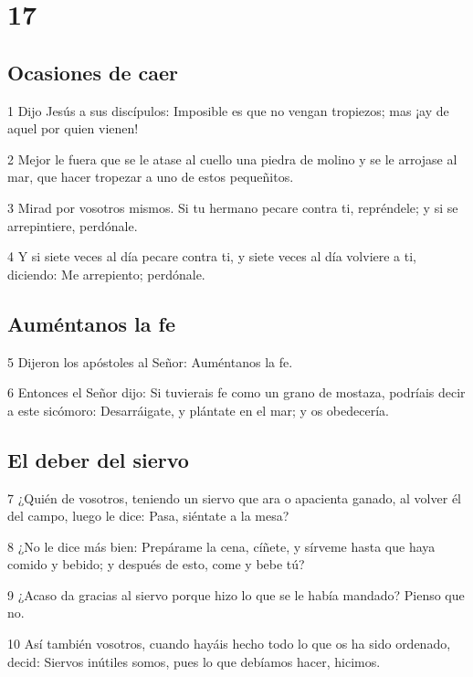 \chapter{17}

\section*{Ocasiones de caer}

\par 1 Dijo Jesús a sus discípulos: Imposible es que no vengan tropiezos; mas ¡ay de aquel por quien vienen!
\par 2 Mejor le fuera que se le atase al cuello una piedra de molino y se le arrojase al mar, que hacer tropezar a uno de estos pequeñitos.
\par 3 Mirad por vosotros mismos. Si tu hermano pecare contra ti, repréndele; y si se arrepintiere, perdónale.
\par 4 Y si siete veces al día pecare contra ti, y siete veces al día volviere a ti, diciendo: Me arrepiento; perdónale.

\section*{Auméntanos la fe}

\par 5 Dijeron los apóstoles al Señor: Auméntanos la fe.
\par 6 Entonces el Señor dijo: Si tuvierais fe como un grano de mostaza, podríais decir a este sicómoro: Desarráigate, y plántate en el mar; y os obedecería.

\section*{El deber del siervo}

\par 7 ¿Quién de vosotros, teniendo un siervo que ara o apacienta ganado, al volver él del campo, luego le dice: Pasa, siéntate a la mesa?
\par 8 ¿No le dice más bien: Prepárame la cena, cíñete, y sírveme hasta que haya comido y bebido; y después de esto, come y bebe tú?
\par 9 ¿Acaso da gracias al siervo porque hizo lo que se le había mandado? Pienso que no.
\par 10 Así también vosotros, cuando hayáis hecho todo lo que os ha sido ordenado, decid: Siervos inútiles somos, pues lo que debíamos hacer, hicimos.

